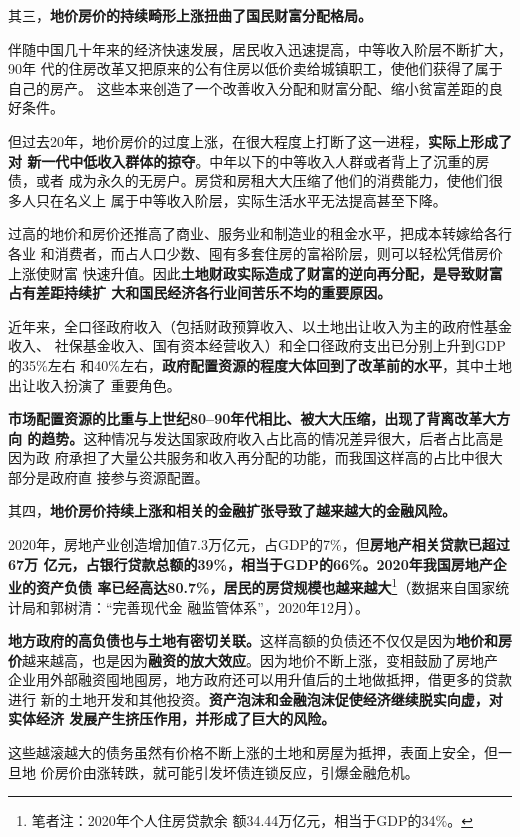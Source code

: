 其三，\textbf{地价房价的持续畸形上涨扭曲了国民财富分配格局。}

伴随中国几十年来的经济快速发展，居民收入迅速提高，中等收入阶层不断扩大，90年
代的住房改革又把原来的公有住房以低价卖给城镇职工，使他们获得了属于自己的房产。
这些本来创造了一个改善收入分配和财富分配、缩小贫富差距的良好条件。

但过去20年，地价房价的过度上涨，在很大程度上打断了这一进程，\textbf{实际上形成了对
  新一代中低收入群体的掠夺}。中年以下的中等收入人群或者背上了沉重的房债，或者
成为永久的无房户。房贷和房租大大压缩了他们的消费能力，使他们很多人只在名义上
属于中等收入阶层，实际生活水平无法提高甚至下降。

过高的地价和房价还推高了商业、服务业和制造业的租金水平，把成本转嫁给各行各业
和消费者，而占人口少数、囤有多套住房的富裕阶层，则可以轻松凭借房价上涨使财富
快速升值。因此\textbf{土地财政实际造成了财富的逆向再分配，是导致财富占有差距持续扩
  大和国民经济各行业间苦乐不均的重要原因。}

近年来，全口径政府收入（包括财政预算收入、以土地出让收入为主的政府性基金收入、
社保基金收入、国有资本经营收入）和全口径政府支出已分别上升到GDP的35\%左右
和40\%左右，\textbf{政府配置资源的程度大体回到了改革前的水平}，其中土地出让收入扮演了
重要角色。

\textbf{市场配置资源的比重与上世纪80--90年代相比、被大大压缩，出现了背离改革大方向
  的趋势。}这种情况与发达国家政府收入占比高的情况差异很大，后者占比高是因为政
府承担了大量公共服务和收入再分配的功能，而我国这样高的占比中很大部分是政府直
接参与资源配置。

其四，\textbf{地价房价持续上涨和相关的金融扩张导致了越来越大的金融风险。}

2020年，房地产业创造增加值7.3万亿元，占GDP的7\%，但\textbf{房地产相关贷款已超过67万
  亿元，占银行贷款总额的39\%，相当于GDP的66\%。2020年我国房地产企业的资产负债
  率已经高达80.7\%，居民的房贷规模也越来越大}\footnote{笔者注：2020年个人住房贷款余
  额34.44万亿元，相当于GDP的34\%。}（数据来自国家统计局和郭树清：“完善现代金
融监管体系”，2020年12月）。

\textbf{地方政府的高负债也与土地有密切关联。}这样高额的负债还不仅仅是因为\textbf{地价和房
  价}越来越高，也是因为\textbf{融资的放大效应}。因为地价不断上涨，变相鼓励了房地产
企业用外部融资囤地囤房，地方政府还可以用升值后的土地做抵押，借更多的贷款进行
新的土地开发和其他投资。\textbf{资产泡沫和金融泡沫促使经济继续脱实向虚，对实体经济
  发展产生挤压作用，并形成了巨大的风险。}

这些越滚越大的债务虽然有价格不断上涨的土地和房屋为抵押，表面上安全，但一旦地
价房价由涨转跌，就可能引发坏债连锁反应，引爆金融危机。

